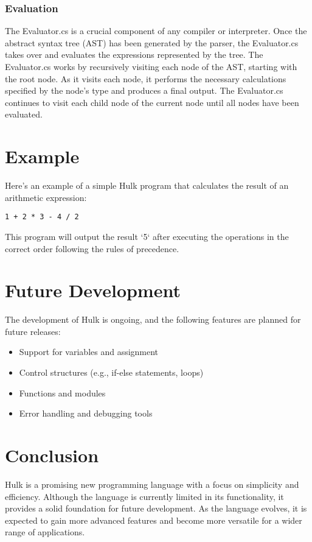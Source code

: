 \documentclass[12pt]{article}
\begin{document}
\subsubsection{Evaluation}
The Evaluator.cs is a crucial component of any compiler or interpreter. Once the abstract syntax tree (AST) has been generated by the parser, the Evaluator.cs takes over and evaluates the expressions represented by the tree.
The Evaluator.cs works by recursively visiting each node of the AST, starting with the root node. As it visits each node, it performs the necessary calculations specified by the node's type and produces a final output. The Evaluator.cs continues to visit each child node of the current node until all nodes have been evaluated.

\section{Example}
Here's an example of a simple Hulk program that calculates the result of an arithmetic expression:

\begin{lstlisting}
1 + 2 * 3 - 4 / 2
\end{lstlisting}

This program will output the result `5` after executing the operations in the correct order following the rules of precedence.

\section{Future Development}
The development of Hulk is ongoing, and the following features are planned for future releases:

\begin{itemize}
    \item Support for variables and assignment
    \item Control structures (e.g., if-else statements, loops)
    \item Functions and modules
    \item Error handling and debugging tools
\end{itemize}

\section{Conclusion}
Hulk is a promising new programming language with a focus on simplicity and efficiency. Although the language is currently limited in its functionality, it provides a solid foundation for future development. As the language evolves, it is expected to gain more advanced features and become more versatile for a wider range of applications.
\end{document}

